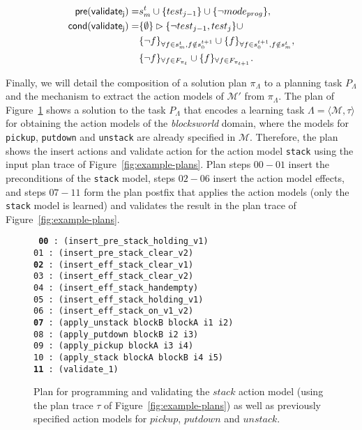 \documentclass[runningheads]{llncs}
\newcommand{\tup}[1]{{\langle #1 \rangle}}
\newcommand{\pre}{\mathsf{pre}}     %
\newcommand{\cond}{\mathsf{cond}}   %
\begin{document}
\begin{small}
	\begin{align*}
	\hspace*{7pt}\pre(\mathsf{validate_{j}})=&s_m^t\cup\{test_{j-1}\}\cup \{\neg mode_{prog}\},\\
	\cond(\mathsf{validate_{j}})=&\{\emptyset\}\rhd\{\neg test_{j-1},test_j\} \cup \\
	&\{\neg f\}_{\forall f\in s_m^t, f \notin s_0^{t+1}}\cup \{f\}_{\forall f\in s_0^{t+1}, f \notin s_m^t},\\
	&\{\neg f\}_{\forall f\in F_{\pi_t}}\cup \{f\}_{\forall f\in F_{\pi_{t+1}}}.\\
	\end{align*}
\end{small}

Finally, we will detail the composition of a solution plan $\pi_\Lambda$ to a planning task $P_\Lambda$ and the mechanism to extract the action models of $\mathcal{M}'$ from $\pi_\Lambda$. The plan of Figure~\ref{fig:plan-lplan} shows a solution to the task $P_{\Lambda}$ that encodes a learning task $\Lambda=\tup{\mathcal{M},\tau}$ for obtaining the action models of the {\em blocksworld} domain, where the models for {\tt\small pickup}, {\tt\small putdown} and {\tt\small unstack} are already specified in $\mathcal{M}$. Therefore, the plan shows the insert actions and validate action for the action model {\tt\small stack} using the input plan trace of Figure~\ref{fig:example-plans}. Plan steps $00-01$ insert the preconditions of the {\tt\small stack} model, steps $02-06$ insert the action model effects, and steps $07-11$ form the plan postfix that applies the action models (only the {\tt\small stack} model is learned) and validates the result in the plan trace of Figure~\ref{fig:example-plans}.

\begin{figure}[hbt!]
	{\footnotesize\tt
		{\bf 00} : (insert\_pre\_stack\_holding\_v1) \\
		01 : (insert\_pre\_stack\_clear\_v2)\\
		{\bf 02} : (insert\_eff\_stack\_clear\_v1)\\
		03 : (insert\_eff\_stack\_clear\_v2)\\
		04 : (insert\_eff\_stack\_handempty)\\
		05 : (insert\_eff\_stack\_holding\_v1)\\
		06 : (insert\_eff\_stack\_on\_v1\_v2)\\
		{\bf 07} : (apply\_unstack blockB blockA i1 i2)\\
		08 : (apply\_putdown blockB i2 i3)\\
		09 : (apply\_pickup blockA i3 i4)\\
		10 : (apply\_stack blockA blockB i4 i5)\\
		{\bf 11} : (validate\_1)
	}
	\caption{\small Plan for programming and validating the $stack$ action model (using the plan trace $\tau$ of Figure~\ref{fig:example-plans}) as well as previously specified action models for $pickup$, $putdown$ and $unstack$.}
	\label{fig:plan-lplan}
\end{figure}
\end{document}
